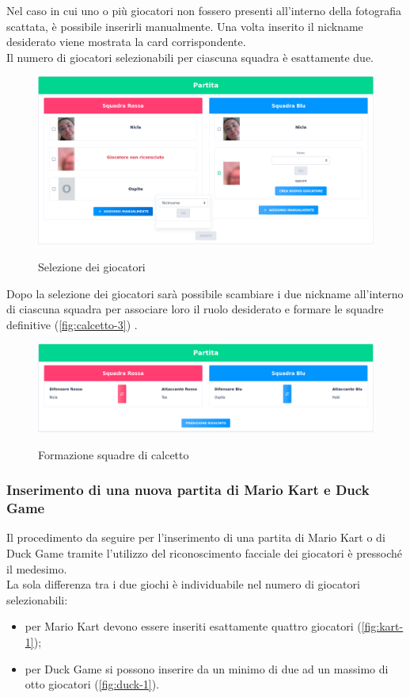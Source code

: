 		\noindent Nel caso in cui uno o più giocatori non fossero presenti all'interno della fotografia scattata, è possibile inserirli manualmente. Una volta inserito il nickname desiderato viene mostrata la card corrispondente. \\
		Il numero di giocatori selezionabili per ciascuna squadra è esattamente due. 
		
		\begin{figure}[H]
			\centering
			\includegraphics[width=\textwidth]{immagini/calcetto-2.png} \\
			\caption{\label{fig:calcetto-2} Selezione dei giocatori}
		\end{figure}
		
		\noindent Dopo la selezione dei giocatori sarà possibile scambiare i due nickname all'interno di ciascuna squadra per associare loro il ruolo desiderato e formare le squadre definitive (\autoref{fig:calcetto-3}) .
			
		\begin{figure}[H]
			\centering
			\includegraphics[width=\textwidth]{immagini/calcetto-3.png} \\
			\caption{\label{fig:calcetto-3} Formazione squadre di calcetto}
		\end{figure}
		
		
		\subsubsection{Inserimento di una nuova partita di Mario Kart e Duck Game}
		Il procedimento da seguire per l'inserimento di una partita di Mario Kart o di Duck Game tramite l'utilizzo del riconoscimento facciale dei giocatori è pressoché il medesimo. \\
		La sola differenza tra i due giochi è individuabile nel numero di giocatori selezionabili: 
		\begin{itemize}
			\item per Mario Kart devono essere inseriti esattamente quattro giocatori (\autoref{fig:kart-1});
			\item per Duck Game si possono inserire da un minimo di due ad un massimo di otto giocatori (\autoref{fig:duck-1}).
		\end{itemize}
	
